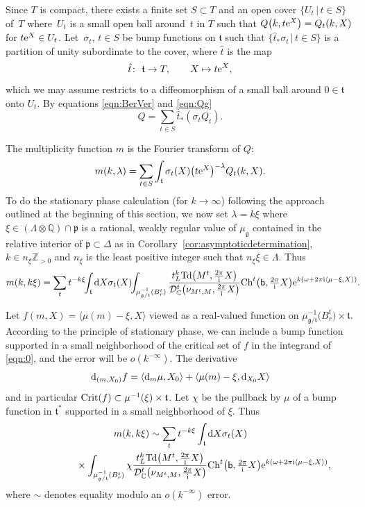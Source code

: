 \documentclass[pdftex]{sigma}
\numberwithin{equation}{section}
\newcommand{\pair}[2]{\langle #1, #2 \rangle}
\newcommand{\tn}[1]{\textnormal{#1}}
\renewcommand{\i}{{\mathrm{i}}}
\def\g{\ensuremath{\mathfrak{g}}}
\def\t{\ensuremath{\mathfrak{t}}}
\def\p{\ensuremath{\mathfrak{p}}}
\def\bC{\ensuremath{\mathbb{C}}}
\def\bZ{\ensuremath{\mathbb{Z}}}
\def\bQ{\ensuremath{\mathbb{Q}}}
\def\Ch{\ensuremath{\textnormal{Ch}}}
\def\Td{\ensuremath{\textnormal{Td}}}
\def\calDC{\ensuremath{\mathcal{D}_{\bC}}}
\begin{document}
Since $T$ is compact, there exists a finite set $S \subset T$ and an open cover $\{U_t\,|\,t \in S\}$ of~$T$ where~$U_t$ is a small open ball around~$t$ in $T$ such that $Q\big(k,t{\rm e}^X\big)=Q_t(k,X)$ for $t{\rm e}^X \in U_t$. Let~$\sigma_t$, $t \in S$ be bump functions on $\t$ such that $\{\hat{t}_\ast \sigma_t\,|\,t \in S\}$ is a partition of unity subordinate to the cover, where $\hat{t}$ is the map
\[ \hat{t}\colon \ \t \rightarrow T, \qquad X \mapsto t{\rm e}^X,\]
which we may assume restricts to a diffeomorphism of a small ball around $0 \in \t$ onto $U_t$. By equations \eqref{eqn:BerVer} and \eqref{eqn:Qg}
\[ Q=\sum_{t \in S} \hat{t}_\ast (\sigma_t Q_t). \]

The multiplicity function $m$ is the Fourier transform of $Q$:
\[ m(k,\lambda)=\sum_{t\in S} \int_{\t} \sigma_t(X)\big(t{\rm e}^X\big)^{-\lambda}Q_t(k,X).\]
To do the stationary phase calculation (for $k \rightarrow \infty$) following the approach outlined at the beginning of this section, we now set $\lambda=k\xi$ where $\xi \in (\Lambda \otimes \bQ)\cap \p$ is a rational, weakly regular value of $\mu_\g$ contained in the relative interior of $\p \subset \Delta$ as in Corollary~\ref{cor:asymptoticdetermination}, $k \in n_\xi\bZ_{>0}$ and $n_\xi$ is the least positive integer such that $n_\xi\xi \in \Lambda$. Thus
\begin{gather}\label{eqn:0}
m(k,k\xi)=\sum_t t^{-k\xi}\!\!\int_\t {\rm d} X \sigma_t(X)\!\! \int_{\mu_{\g/\t}^{-1}(B_r^t)} \frac{t_L^k\Td\big(M^t,\tfrac{2\pi}{\i}X\big)}{\calDC^t\big(\nu_{M^t,M},\tfrac{2\pi}{\i}X\big)}\Ch^t\big({\sf b},\tfrac{2\pi}{\i}X\big){\rm e}^{k(\omega+2\pi \i\pair{\mu-\xi}{X})}.\!\!\!\!
\end{gather}

Let $f(m,X)=\pair{\mu(m)-\xi}{X}$ viewed as a real-valued function on $\mu_{\g/\t}^{-1}\big(B_r^t\big) \times \t$. According to the principle of stationary phase, we can include a bump function supported in a small neighborhood of the critical set of $f$ in the integrand of \eqref{eqn:0}, and the error will be $o(k^{-\infty})$. The derivative
\[ {\rm d}_{(m,X_0)}f=\pair{{\rm d}_m\mu}{X_0}+\pair{\mu(m)-\xi}{{\rm d}_{X_0}X}\]
and in particular $\tn{Crit}(f)\subset \mu^{-1}(\xi)\times \t$. Let $\chi$ be the pullback by $\mu$ of a bump function in $\t^\ast$ supported in a small neighborhood of $\xi$. Thus{\samepage
\begin{gather}
m(k,k\xi)\sim \sum_t t^{-k\xi} \int_\t {\rm d}X \sigma_t(X)\nonumber\\
\hphantom{m(k,k\xi)\sim}{}\times \int_{\mu_{\g/\t}^{-1}(B_r^t)}\chi \frac{t_L^k \Td\big(M^t,\tfrac{2\pi}{\i}X\big)}{\calDC^t\big(\nu_{M^t,M},\tfrac{2\pi}{\i}X\big)}\Ch^t\big({\sf b},\tfrac{2\pi}{\i}X\big){\rm e}^{k(\omega+2\pi \i\pair{\mu-\xi}{X})},\label{eqn:1}
\end{gather}
where $\sim$ denotes equality modulo an $o(k^{-\infty})$ error.}
\end{document}
